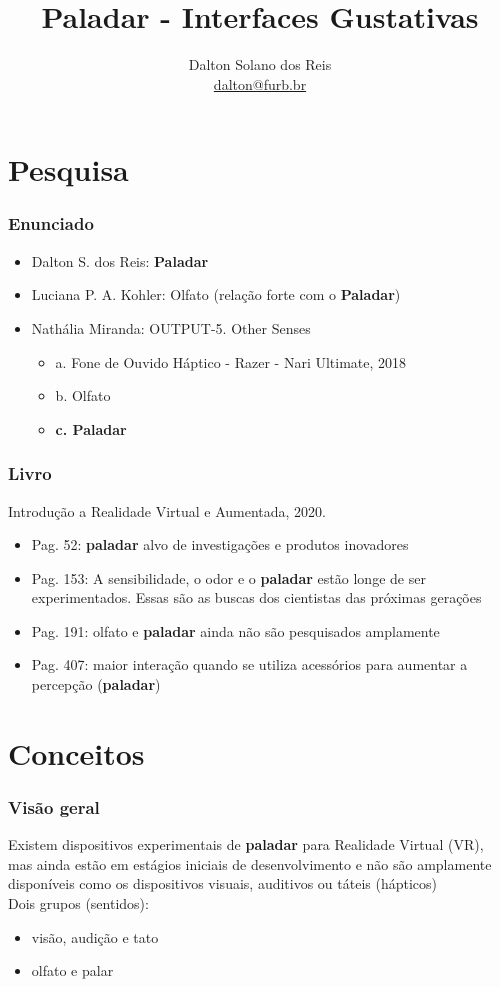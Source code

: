 \documentclass{beamer}
\title[Paladar - Interfaces Gustativas]{Paladar - Interfaces Gustativas}
\author[Dalton Solano dos Reis]{
  Dalton Solano dos Reis\texorpdfstring{\\\medskip}{}%
  {\small \href{mailto:dalton@furb.br}{dalton@furb.br}}}
\institute[UDESC]{
  Centro de Ciências e Tecnológicas\\
  Universidade do Estado de Santa Catarina}
\begin{document}
\begin{frame}
  \titlepage

\end{frame}

\section{Pesquisa}
\begin{frame}
  \frametitle{Enunciado}
  \begin{itemize}
    \item Dalton S. dos Reis: \textbf{Paladar}
    \item Luciana P. A. Kohler: Olfato (relação forte com o \textbf{Paladar})  
    \item Nathália Miranda: OUTPUT-5. Other Senses
    \begin{itemize}
      \item a. Fone de Ouvido Háptico - Razer - Nari Ultimate, 2018
      \item b. Olfato
      \item \textbf{c. Paladar}  
    \end{itemize} 
  \end{itemize}
\end{frame}

\begin{frame}
  \frametitle{Livro}
  Introdução a Realidade Virtual e Aumentada, 2020. \\
  \begin{itemize}
    \item Pag. 52: \textbf{paladar} alvo de investigações e produtos inovadores
    \item Pag. 153: A sensibilidade, o odor e o \textbf{paladar} estão longe de ser experimentados. Essas são as buscas dos cientistas das próximas gerações
    \item Pag. 191: olfato e \textbf{paladar} ainda não são pesquisados amplamente
    \item Pag. 407: maior interação quando se utiliza acessórios para aumentar a percepção (\textbf{paladar})
  \end{itemize}
  \cite{toriIntroducaoRealidadeVirtual2020}
\end{frame}

\section{Conceitos}
\begin{frame}
  \frametitle{Visão geral}
  Existem dispositivos experimentais de \textbf{paladar} para Realidade Virtual (VR), mas ainda estão em estágios iniciais de desenvolvimento e não são amplamente disponíveis como os dispositivos visuais, auditivos ou táteis (hápticos) \\
  \vspace{\baselineskip}
  Dois grupos (sentidos):
  \begin{itemize}
  \item visão, audição e tato
  \item olfato e palar
  \end{itemize}
\end{frame}
\end{document}
